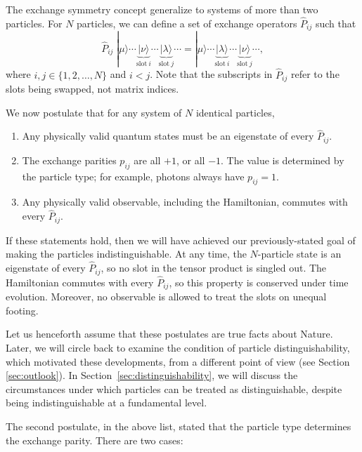 \documentclass[prx,12pt]{revtex4-2}
\begin{document}
The exchange symmetry concept generalize to systems of more than two
particles.  For $N$ particles, we can define a set of exchange
operators $\hat{P}_{ij}$ such that
\begin{equation}
  \hat{P}_{ij} \; |\mu\rangle \cdots \underbrace{|\nu\rangle}_{\mathrm{slot}~i} \cdots \underbrace{|\lambda\rangle}_{\mathrm{slot}~j} \cdots
  = |\mu\rangle \cdots \underbrace{|\lambda\rangle}_{\mathrm{slot}~i} \cdots \underbrace{|\nu\rangle}_{\mathrm{slot}~j} \cdots,
\end{equation}
where $i,j\in\{1,2,\dots,N\}$ and $i < j$.  Note that the subscripts
in $\hat{P}_{ij}$ refer to the slots being swapped, not matrix
indices.

We now postulate that for any system of $N$ identical particles,
\begin{enumerate}
\item Any physically valid quantum states must be an eigenstate of
  every $\hat{P}_{ij}$.

\item The exchange parities $p_{ij}$ are all $+1$, or all $-1$.  The
  value is determined by the particle type; for example, photons
  always have $p_{ij} = 1$.

\item Any physically valid observable, including the Hamiltonian,
  commutes with every $\hat{P}_{ij}$.
\end{enumerate}

\noindent
If these statements hold, then we will have achieved our
previously-stated goal of making the particles indistinguishable.  At
any time, the $N$-particle state is an eigenstate of every
$\hat{P}_{ij}$, so no slot in the tensor product is singled out.  The
Hamiltonian commutes with every $\hat{P}_{ij}$, so this property is
conserved under time evolution.  Moreover, no observable is allowed to
treat the slots on unequal footing.

Let us henceforth assume that these postulates are true facts about
Nature.  Later, we will circle back to examine the condition of
particle distinguishability, which motivated these developments, from
a different point of view (see Section \ref{sec:outlook}).  In
Section~\ref{sec:distinguishability}, we will discuss the
circumstances under which particles can be treated as distinguishable,
despite being indistinguishable at a fundamental level.

The second postulate, in the above list, stated that the particle type
determines the exchange parity.  There are two cases:
\end{document}

